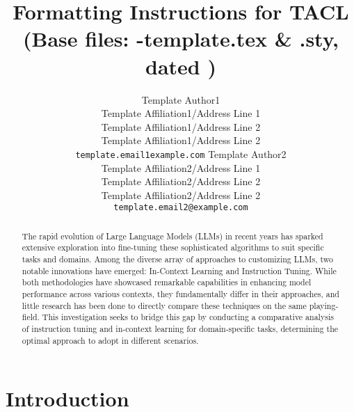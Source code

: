 \documentclass[11pt,a4paper]{article}
\title{Formatting Instructions for TACL \TaclPapers \\
(Base files: \styleFileVersion-template.tex \& \styleFileVersion.sty, dated \dateOfLastUpdate)}
\author{
  Template Author1\Thanks{The {\em actual} contributors to this instruction
    document and corresponding template file are given in Section
    \ref{sec:contributors}.} 
  \\
  Template Affiliation1/Address Line 1
  \\
  Template Affiliation1/Address Line 2
  \\
  Template Affiliation1/Address Line 2
  \\
  \texttt{template.email1example.com}
  \And
  Template Author2 
  \\
  Template Affiliation2/Address Line 1
  \\
  Template Affiliation2/Address Line 2
  \\
  Template Affiliation2/Address Line 2
  \\
  \texttt{template.email2@example.com}
}
\date{}
\begin{document}
\maketitle
\begin{abstract}
  The rapid evolution of Large Language Models (LLMs) in recent years has sparked extensive exploration into fine-tuning these sophisticated algorithms to suit specific tasks and domains. 
  Among the diverse array of approaches to customizing LLMs, two notable innovations have emerged: In-Context Learning and Instruction Tuning. 
  While both methodologies have showcased remarkable capabilities in enhancing model performance across various contexts, they fundamentally differ in their approaches, and little research has been done to directly compare these techniques on the same playing-field.
  This investigation seeks to bridge this gap by conducting a comparative analysis of instruction tuning and in-context learning for domain-specific tasks, determining the optimal approach to adopt in different scenarios.
\end{abstract}

\iftaclpubformat
\section{Introduction}
\end{document}

